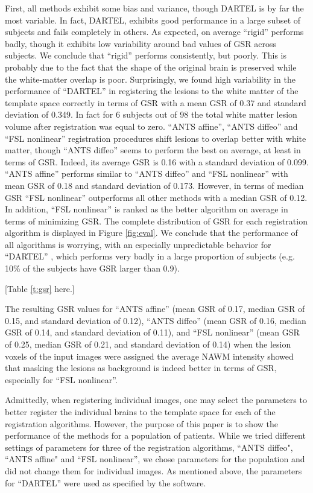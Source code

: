 \documentclass[10pt]{article}
\begin{document}
First, all methods exhibit some bias and variance, though DARTEL is by far the most variable. In fact, DARTEL, exhibits good performance in a large subset of subjects and fails completely in others. 
 As expected, on average ``rigid'' performs badly, though it exhibits low variability around bad values of GSR across subjects. We conclude that ``rigid'' performs consistently, but poorly. This is probably due to the fact that the shape of the original brain is preserved while the white-matter overlap is poor. Surprisingly, we found high variability in the performance of ``DARTEL'' in registering the lesions to the white matter of the template space correctly in terms of GSR with a mean GSR of 0.37 and standard deviation of  0.349. In fact for 6 subjects out of 98 the total white matter lesion volume after registration was equal to zero.  ``ANTS affine'', ``ANTS diffeo'' and ``FSL nonlinear'' registration procedures shift lesions to overlap better with white matter, though ``ANTS diffeo'' seems to perform the best on average, at least in terms of GSR. Indeed, its average GSR is 0.16 with a standard deviation of 0.099. ``ANTS affine'' performs similar to ``ANTS diffeo'' and ``FSL nonlinear'' with mean GSR of 0.18 and standard deviation of 0.173. However, in terms of median GSR ``FSL nonlinear'' outperforms all other methods with a median GSR of 0.12. In addition, ``FSL nonlinear'' is ranked as the better algorithm on average in terms of minimizing GSR. The complete distribution of GSR for each registration algorithm is displayed in Figure \ref{fig:eval}. We conclude that the performance of all algorithms is worrying, with an especially unpredictable behavior for  ``DARTEL'' , which performs very badly in a large proportion of subjects (e.g. 10\% of the subjects have GSR larger than 0.9). 

[Table \ref{t:gsr} here.]

The resulting GSR values for ``ANTS affine'' (mean GSR of 0.17, median GSR of 0.15, and standard deviation of 0.12), ``ANTS diffeo'' (mean GSR of 0.16, median GSR of 0.14, and standard deviation of 0.11), and ``FSL nonlinear'' (mean GSR of 0.25, median GSR of 0.21, and standard deviation of 0.14) when the lesion voxels of the input images were assigned the average NAWM intensity showed that masking the lesions as background is indeed better in terms of GSR, especially for ``FSL nonlinear''. 

Admittedly, when registering individual images, one may select the parameters to better register the individual brains to the template space for each of the registration algorithms. However, the purpose of this paper is to show the performance of the methods for a population of patients. While we tried different settings of parameters for three of the registration algorithms, ``ANTS diffeo", ``ANTS affine" and ``FSL nonlinear'', we chose parameters for the population and did not change them for individual images. As mentioned above, the parameters for ``DARTEL'' were used as specified by the software. 
\end{document}
